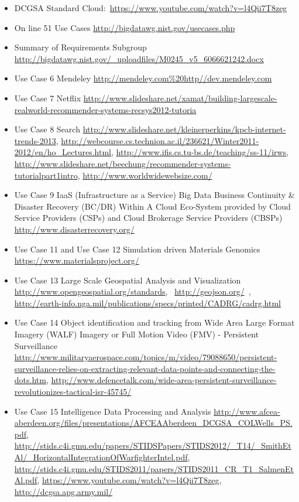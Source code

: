 \begin{itemize}
\item
  DCGSA Standard
  Cloud:~\url{https://www.youtube.com/watch?v=l4Qii7T8zeg}
\item
  On line 51 Use Cases \url{http://bigdatawg.nist.gov/usecases.php}
\item
  Summary of Requirements Subgroup
  \url{http://bigdatawg.nist.gov/_uploadfiles/M0245_v5_6066621242.docx}
\item
  Use Case 6 Mendeley
  \url{http://mendeley.com\%20http//dev.mendeley.com}
\item
  Use Case 7 Netflix
  \url{http://www.slideshare.net/xamat/building-largescale-realworld-recommender-systems-recsys2012-tutoria}
\item
  Use Case 8 Search
  \url{http://www.slideshare.net/kleinerperkins/kpcb-internet-trends-2013},
  \url{http://webcourse.cs.technion.ac.il/236621/Winter2011-2012/en/ho_Lectures.html},
  \url{http://www.ifis.cs.tu-bs.de/teaching/ss-11/irws},
  \url{http://www.slideshare.net/beechung/recommender-systems-tutorialpart1intro},
  \url{http://www.worldwidewebsize.com/}
\item
  Use Case 9 IaaS (Infrastructure as a Service) Big Data Business
  Continuity \& Disaster Recovery (BC/DR) Within A Cloud Eco-System
  provided by Cloud Service Providers (CSPs) and Cloud Brokerage Service
  Providers (CBSPs) \url{http://www.disasterrecovery.org/}
\item
  Use Case 11 and Use Case 12 Simulation driven Materials Genomics
  \url{https://www.materialsproject.org/}
\item
  Use Case 13 Large Scale Geospatial Analysis and Visualization
  \url{http://www.opengeospatial.org/standards},~
  \url{http://geojson.org/}~,
  \url{http://earth-info.nga.mil/publications/specs/printed/CADRG/cadrg.html}~
\item
  Use Case 14 Object identification and tracking from Wide Area Large
  Format Imagery (WALF) Imagery or Full Motion Video (FMV) - Persistent
  Surveillance
  \url{http://www.militaryaerospace.com/topics/m/video/79088650/persistent-surveillance-relies-on-extracting-relevant-data-points-and-connecting-the-dots.htm},
  \url{http://www.defencetalk.com/wide-area-persistent-surveillance-revolutionizes-tactical-isr-45745/}
\item
  Use Case 15 Intelligence Data Processing and Analysis
  \url{http://www.afcea-aberdeen.org/files/presentations/AFCEAAberdeen_DCGSA_COLWells_PS.pdf},
  \url{http://stids.c4i.gmu.edu/papers/STIDSPapers/STIDS2012/_T14/_SmithEtAl/_HorizontalIntegrationOfWarfighterIntel.pdf},
  \url{http://stids.c4i.gmu.edu/STIDS2011/papers/STIDS2011_CR_T1_SalmenEtAl.pdf},
  \url{https://www.youtube.com/watch?v=l4Qii7T8zeg},
  \url{http://dcgsa.apg.army.mil/}



\end{itemize}
